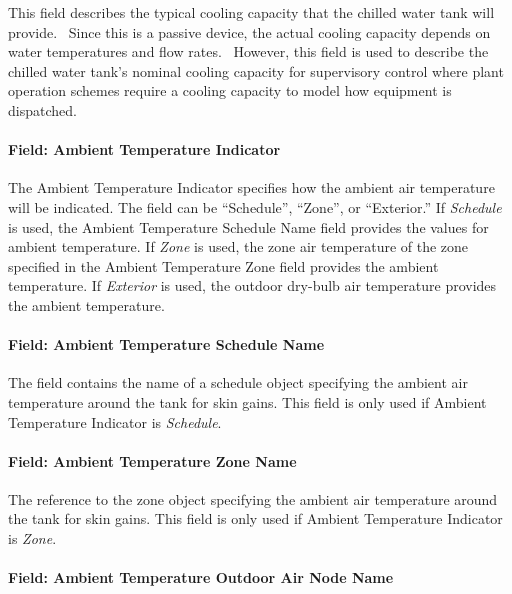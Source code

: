 This field describes the typical cooling capacity that the chilled water tank will provide.~ Since this is a passive device, the actual cooling capacity depends on water temperatures and flow rates.~ However, this field is used to describe the chilled water tank's nominal cooling capacity for supervisory control where plant operation schemes require a cooling capacity to model how equipment is dispatched.

\paragraph{Field: Ambient Temperature Indicator}\label{field-ambient-temperature-indicator}

The Ambient Temperature Indicator specifies how the ambient air temperature will be indicated. The field can be ``Schedule'', ``Zone'', or ``Exterior.'' If \emph{Schedule} is used, the Ambient Temperature Schedule Name field provides the values for ambient temperature. If \emph{Zone} is used, the zone air temperature of the zone specified in the Ambient Temperature Zone field provides the ambient temperature. If \emph{Exterior} is used, the outdoor dry-bulb air temperature provides the ambient temperature.

\paragraph{Field: Ambient Temperature Schedule Name}\label{field-ambient-temperature-schedule-name-000}

The field contains the name of a schedule object specifying the ambient air temperature around the tank for skin gains. This field is only used if Ambient Temperature Indicator is \emph{Schedule}.

\paragraph{Field: Ambient Temperature Zone Name}\label{field-ambient-temperature-zone-name-000}

The reference to the zone object specifying the ambient air temperature around the tank for skin gains. This field is only used if Ambient Temperature Indicator is \emph{Zone}.

\paragraph{Field: Ambient Temperature Outdoor Air Node Name}\label{field-ambient-temperature-outdoor-air-node-name}

